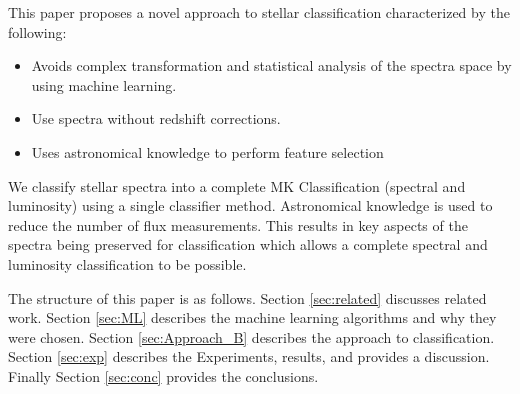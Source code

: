 \documentclass[./AutomatedMK.tex]{subfiles}
\begin{document}
This paper proposes a novel approach to stellar classification characterized by the following:

\begin{itemize}
	\item Avoids complex transformation and statistical analysis of the spectra space by using machine learning.
	\item Use spectra without redshift corrections.
	\item Uses astronomical knowledge to perform feature selection
\end{itemize}

We classify stellar spectra into a complete MK Classification (spectral and luminosity) using a single classifier method. Astronomical knowledge is used to reduce the number of flux measurements. This results in key aspects of the spectra being preserved for classification which allows a  complete spectral and luminosity classification to be possible.

The structure of this paper is as follows. Section \ref{sec:related} discusses related work. Section \ref{sec:ML} describes the machine learning algorithms and why they were chosen. Section \ref{sec:Approach_B} describes the approach to classification. Section \ref{sec:exp} describes the Experiments, results, and provides a discussion. Finally Section \ref{sec:conc} provides the conclusions.
\end{document}
